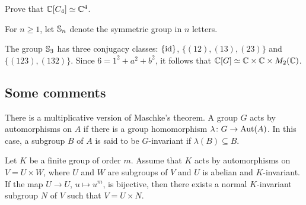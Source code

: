 \begin{exercise}
    Prove that $\mathbb{C}[C_4]\simeq\mathbb{C}^4$. 
\end{exercise}

For $n\geq1$, let $\mathbb{S}_n$ denote the symmetric group in $n$ letters. 

\begin{example}
    The group $\mathbb{S}_3$ has three conjugacy classes:
    $\{\operatorname{id}\}$, $\{(12),(13),(23)\}$ and $\{(123),(132)\}$. 
    Since $6=1^2+a^2+b^2$, it follows that 
    $\mathbb{C}[G]\simeq\mathbb{C}\times\mathbb{C}\times M_2(\mathbb{C})$. 
\end{example}    

\subsection{Some comments}


There is a multiplicative version of Maschke's theorem. A group $G$ acts 
by automorphisms on $A$ if there is a group homomorphism 
$\lambda\colon G\to\operatorname{Aut}(A)$. In this case, a subgroup $B$ of $A$ is said to be 
$G$-invariant if $\lambda(B)\subseteq B$. 

\begin{theorem}
    Let $K$ be a finite group of order $m$. Assume that 
    $K$ acts by automorphisms on $V=U\times W$, where
    $U$ and $W$ are subgroups of $V$ and $U$ is abelian and $K$-invariant. 
    If the map $U\to U$, $u\mapsto u^m$, is bijective, 
    then there exists a normal $K$-invariant subgroup $N$ of $V$ 
    such that $V=U\times N$. 
\end{theorem}

